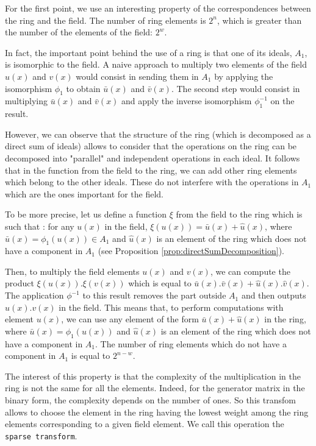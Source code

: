 \documentclass[conference]{IEEEtran}
\begin{document}
For the first point, we use an interesting property of the correspondences between the ring and the field. The number of ring elements is $2^n$, which is greater than the number of the elements of the field: $2^w$.  

In fact, the important point behind the use of a ring is that one of its ideals, $A_1$, is isomorphic to the field. A naive approach to multiply two elements of the field $u(x)$ and $v(x)$ would consist in sending them in $A_1$ by applying the isomorphism $\phi_1$ to obtain $\bar{u}(x)$ and $\bar{v}(x)$. The second step would consist in multiplying  $\bar{u}(x)$ and $\bar{v}(x)$ and apply the inverse isomorphism $\phi_1^{-1}$ on the result.

However, we can observe that the structure of the ring (which is decomposed as a direct sum of ideals) allows to consider that the operations on the ring can be decomposed into "parallel" and independent operations in each ideal. It follows that in the function from the field to the ring, we can add other ring elements which belong to the other ideals. These do not interfere with the operations in $A_1$ which are the ones important for the field. 

To be more precise, let us define a function $\xi$ from the field to the ring which is such that :
for any $u(x)$ in the field, $\xi(u(x))=\bar{u}(x)+\hat{u}(x)$, where $\bar{u}(x)=\phi_1(u(x)) \in A_1$ and $\hat{u}(x)$ is an element of the ring which does not have a component in $A_1$ (see Proposition \ref{prop:directSumDecomposition}). 


Then, to multiply the field elements $u(x)$ and $v(x)$, we can compute the product $\xi(u(x)).\xi(v(x))$ which is equal to $\bar{u}(x).\bar{v}(x)+\hat{u}(x).\hat{v}(x)$. The application $\phi^{-1}$ to this result removes the part outside $A_1$ and then outputs $u(x).v(x)$ in the field. This means that, to perform computations with element $u(x)$, we can use any element of the form $ \bar{u}(x)+\hat{u}(x)$ in the ring, where $\bar{u}(x)=\phi_1(u(x))$ and $\hat{u}(x)$ is an element of the ring which does not have a component in $A_1$. The number of ring elements which do not have a component in $A_1$ is equal to $2^{n-w}$. 

The interest of this property is that the complexity of the multiplication in the ring is not the same for all the elements. Indeed, for the generator matrix in the binary form, the complexity depends on the number of ones. So this transfom allows to choose the element in the ring having the lowest weight among the ring elements corresponding to a given field element. We call this operation the \texttt{sparse transform}.
\end{document}
